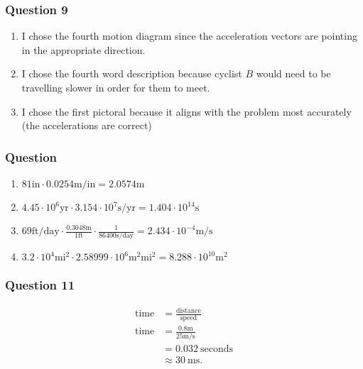 \subsubsection{Question 9}

\vspace{1em}

\begin{solution}
	\begin{enumerate}[label=\Alph*.]
		\item I chose the fourth motion diagram since the acceleration vectors are pointing in the appropriate direction.
		\item I chose the fourth word description because cyclist $B$ would need to be travelling slower in order for them to meet.
		\item I chose the first pictoral because it aligns with the problem most accurately (the accelerations are correct)
	\end{enumerate}
\end{solution}

\subsubsection{Question}

\vspace{1em}

\begin{solution}
	\begin{enumerate}[label=\Alph*.]
		\item $81 \text{in} \cdot 0.0254 \text{m/in} = 2.0574 \text{m}$
		\item $4.45 \cdot 10^{6} \text{yr} \cdot 3.154 \cdot 10^{7} \text{s/yr} = 1.404 \cdot 10^{14} \text{s}$
		\item $69 \text{ft/day} \cdot \frac{0.3048\text{m}}{1\text{ft}} \cdot \frac{1}{86400\text{s/day}} = 2.434 \cdot 10^{-4}\text{m/s}$ 
		\item $3.2 \cdot 10^{4}\text{mi}^2 \cdot 2.58999 \cdot 10^{6} \text{m}^2\text{mi}^2 = 8.288 \cdot 10^{10} \text{m}^2$
	\end{enumerate}
\end{solution}

\subsubsection{Question 11}

\vspace{1em}

\begin{solution}
	\begin{align*}
		\text{time} &= \frac{\text{distance}}{\text{speed}} \\
		\text{time} &= \frac{0.8\text{m}}{25\text{m/s}} \\
		&= 0.032~\text{seconds} \\
		&\approx 30~\text{ms}
	.\end{align*}
\end{solution}

